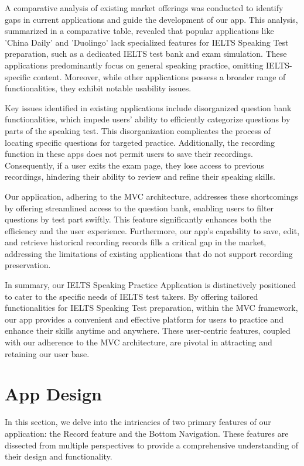 \documentclass[conference,10pt,letterpaper]{IEEEtran}
\begin{document}
	A comparative analysis of existing market offerings was conducted to identify gaps in current applications and guide the development of our app. This analysis, summarized in a comparative table, revealed that popular applications like 'China Daily' and 'Duolingo' lack specialized features for IELTS Speaking Test preparation, such as a dedicated IELTS test bank and exam simulation. These applications predominantly focus on general speaking practice, omitting IELTS-specific content. Moreover, while other applications possess a broader range of functionalities, they exhibit notable usability issues.
	
	Key issues identified in existing applications include disorganized question bank functionalities, which impede users' ability to efficiently categorize questions by parts of the speaking test. This disorganization complicates the process of locating specific questions for targeted practice. Additionally, the recording function in these apps does not permit users to save their recordings. Consequently, if a user exits the exam page, they lose access to previous recordings, hindering their ability to review and refine their speaking skills.
	
	Our application, adhering to the MVC architecture, addresses these shortcomings by offering streamlined access to the question bank, enabling users to filter questions by test part swiftly. This feature significantly enhances both the efficiency and the user experience. Furthermore, our app's capability to save, edit, and retrieve historical recording records fills a critical gap in the market, addressing the limitations of existing applications that do not support recording preservation.
	
	In summary, our IELTS Speaking Practice Application is distinctively positioned to cater to the specific needs of IELTS test takers. By offering tailored functionalities for IELTS Speaking Test preparation, within the MVC framework, our app provides a convenient and effective platform for users to practice and enhance their skills anytime and anywhere. These user-centric features, coupled with our adherence to the MVC architecture, are pivotal in attracting and retaining our user base.
	
	\section{App Design}
	
	In this section, we delve into the intricacies of two primary features of our application: the Record feature and the Bottom Navigation. These features are dissected from multiple perspectives to provide a comprehensive understanding of their design and functionality.
	
\end{document}
